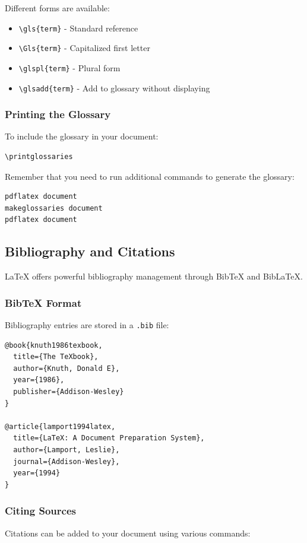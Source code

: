 Different forms are available:
\begin{itemize}
    \item \texttt{\textbackslash gls\{term\}} - Standard reference
    \item \texttt{\textbackslash Gls\{term\}} - Capitalized first letter
    \item \texttt{\textbackslash glspl\{term\}} - Plural form
    \item \texttt{\textbackslash glsadd\{term\}} - Add to glossary without displaying
\end{itemize}

\subsubsection{Printing the Glossary}\label{subsubsec:printing-glossary}
To include the glossary in your document:

\begin{verbatim}
\printglossaries
\end{verbatim}

Remember that you need to run additional commands to generate the glossary:
\begin{verbatim}
pdflatex document
makeglossaries document
pdflatex document
\end{verbatim}

\subsection{Bibliography and Citations}\label{subsec:bibliography}
LaTeX offers powerful bibliography management through BibTeX and BibLaTeX\@.

\subsubsection{BibTeX Format}\label{subsubsec:bibtex-format}
Bibliography entries are stored in a \texttt{.bib} file:

\begin{verbatim}
@book{knuth1986texbook,
  title={The TeXbook},
  author={Knuth, Donald E},
  year={1986},
  publisher={Addison-Wesley}
}

@article{lamport1994latex,
  title={LaTeX: A Document Preparation System},
  author={Lamport, Leslie},
  journal={Addison-Wesley},
  year={1994}
}
\end{verbatim}

\subsubsection{Citing Sources}\label{subsubsec:citing}
Citations can be added to your document using various commands:

